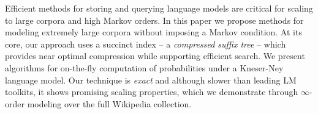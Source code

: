 Efficient methods for storing and querying language models are critical for scaling to large corpora and high Markov orders.
In this paper we propose methods for modeling extremely large corpora without
imposing a Markov condition.
At its core, our approach uses a succinct index -- a \emph{compressed suffix tree} -- which provides near optimal compression while supporting efficient search.
We present algorithms for on-the-fly computation of probabilities under a
Kneser-Ney language model.
Our technique is \emph{exact} and although slower than leading LM
toolkits, it shows promising scaling properties,
which we demonstrate through $\infty$-order modeling over the full Wikipedia collection. 


